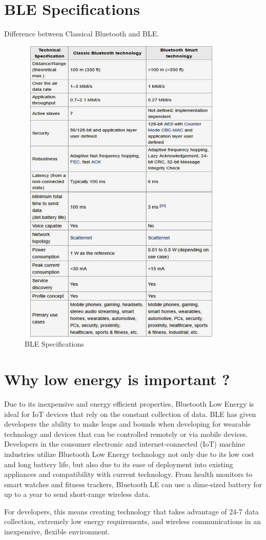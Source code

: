 \documentclass[11pt,a4paper]{article}
\begin{document}
    \newpage
	\section{BLE Specifications}
	Difference between Classical Bluetooth and BLE.
	\begin{figure}[h]
    \centering
    \includegraphics[width=10cm,height=15cm]{table.jpg}
    \caption{BLE Specifications}
    \end{figure}
	
	  \newpage
	\section{Why low energy is important ?}
	{
Due to its inexpensive and energy efficient properties, Bluetooth Low Energy is ideal for IoT devices that rely on the constant collection of data. BLE has given developers the ability to make leaps and bounds when developing for wearable technology and devices that can be controlled remotely or via mobile devices. Developers in the consumer electronic and internet-connected (IoT) machine industries utilize Bluetooth Low Energy technology not only due to its low cost and long battery life, but also due to its ease of deployment into existing appliances and compatibility with current technology. From health monitors to smart watches and fitness trackers, Bluetooth LE can use a dime-sized battery for up to a year to send short-range wireless data.

For developers, this means creating technology that takes advantage of 24-7 data collection, extremely low energy requirements, and wireless communications in an inexpensive, flexible environment.
	}
	
\end{document}
